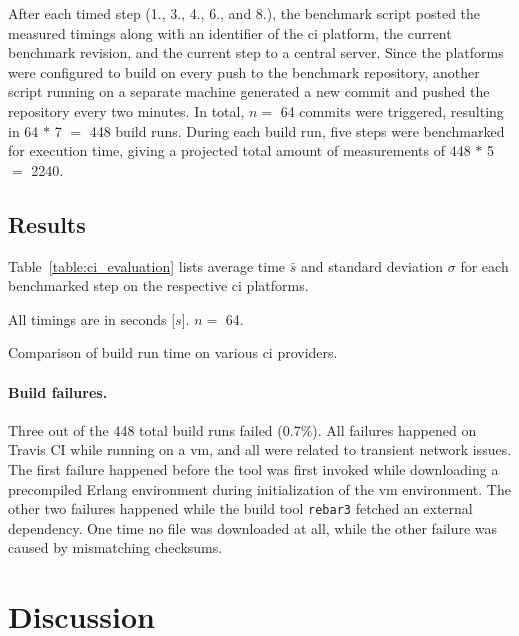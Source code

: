 After each timed step (1., 3., 4., 6., and 8.), the benchmark script posted the measured timings along with an identifier of the \acrshort{ci} platform, the current benchmark revision, and the current step to a central server. Since the platforms were configured to build on every push to the benchmark repository, another script running on a separate machine generated a new commit and pushed the repository every two minutes.
In total, $n=$ 64 commits were triggered, resulting in 64 $*$ 7 $=$ 448 build runs. During each build run, five steps were benchmarked for execution time, giving a projected total amount of measurements of 448 $*$ 5 $=$ 2240.

\cleardoublepage
\subsection{Results}
Table~\ref{table:ci_evaluation} lists average time $\bar{s}$ and standard deviation $\sigma$ for each benchmarked step on the respective \acrshort{ci} platforms.

\begin{table}[h]
  \setlength{\tabcolsep}{8.6pt}
  \renewcommand{\arraystretch}{1.5}
  \centering
  
  \vspace{6pt}
  All timings are in seconds [$s$]. $n=$ 64.

  \caption{Comparison of build run time on various \acrshort{ci} providers.}\label{table:ci_evaluation}
\end{table}

\paragraph{Build failures.} Three out of the 448 total build runs failed (0.7$\%$). All failures happened on Travis CI while running on a \acrshort{vm}, and all were related to transient network issues. The first failure happened before the tool was first invoked while downloading a precompiled Erlang environment during initialization of the \acrshort{vm} environment.
The other two failures happened while the build tool \lstinline|rebar3| fetched an external dependency. One time no file was downloaded at all, while the other failure was caused by mismatching checksums.

\cleardoublepage
\section{Discussion}

